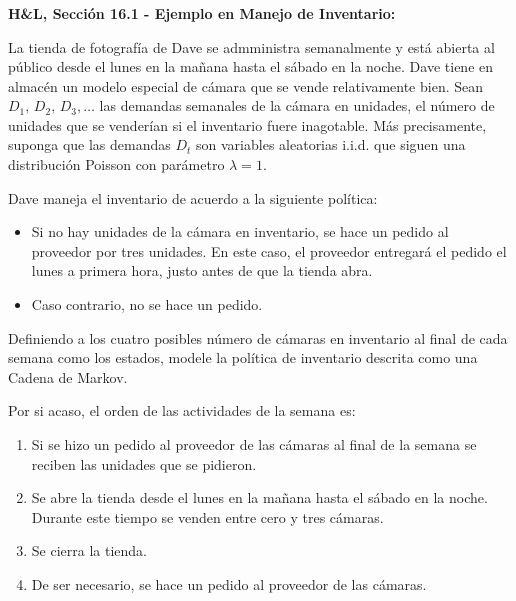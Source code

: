\documentclass[ 10pt, xcolor = dvipsnames]{beamer}
\begin{document}
\begin{frame}[allowframebreaks]
\frametitle{\insertsubsection}

\textbf{H\&L, Secci\'on 16.1 - Ejemplo en Manejo de Inventario:}

La tienda de fotograf\'ia de Dave se admministra semanalmente y est\'a abierta al p\'ublico desde el lunes en la ma\~nana hasta el s\'abado en la noche. Dave tiene en almac\'en un modelo especial de c\'amara que se vende relativamente bien. \linebreak Sean $D_1, \, D_2, \, D_3, \dots$ las demandas semanales de la c\'amara en unidades, \linebreak \ie el n\'umero de unidades que se vender\'ian si el inventario fuere inagotable. \linebreak M\'as precisamente, suponga que las demandas $D_t$ son variables aleatorias i.i.d. \linebreak que siguen una distribuci\'on Poisson con par\'ametro $\lambda = 1$. 

Dave maneja el inventario de acuerdo a la siguiente pol\'itica:
\begin{itemize}
\item Si no hay unidades de la c\'amara en inventario, se hace un pedido al proveedor por tres unidades. En este caso, el proveedor entregar\'a el pedido \linebreak el lunes a primera hora, justo antes de que la tienda abra. 
\item Caso contrario, no se hace un pedido. 
\end{itemize}
\framebreak

Definiendo a los cuatro posibles n\'umero de c\'amaras en inventario al final de cada semana como los estados, modele la pol\'itica de inventario descrita como una Cadena de Markov. 

Por si acaso, el orden de las actividades de la \tava semana es: 
\begin{enumerate}
\item Si se hizo un pedido al proveedor de las c\'amaras al final de la \linebreak \tmava semana se reciben las unidades que se pidieron. 
\item Se abre la tienda desde el lunes en la ma\~nana hasta el s\'abado en la noche. Durante este tiempo se venden entre cero y tres c\'amaras. 
\item Se cierra la tienda. 
\item De ser necesario, se hace un pedido al proveedor de las c\'amaras. 
\end{enumerate}
\framebreak


\end{frame}
\end{document}
